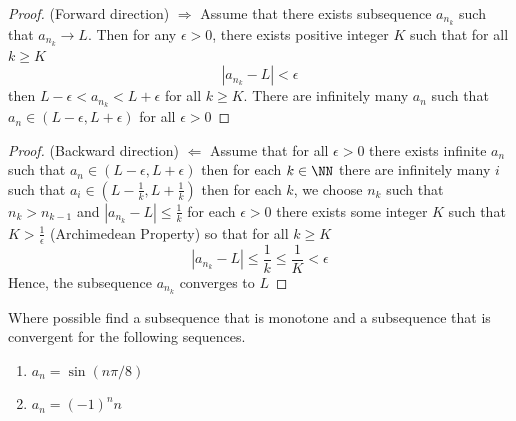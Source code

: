 \documentclass[11pt]{article}
\begin{document}
\begin{proof} (Forward direction)
  $\Longrightarrow$ Assume that there exists subsequence $a_{n_k}$ such that $a_{n_k} \rightarrow L$. 
  Then for any $\epsilon > 0$, there exists positive integer $K$ such that for all $k \geq K$ $$|a_{n_k} - L| < \epsilon$$
  then $L-\epsilon < a_{n_k} < L+\epsilon$ for all $k \geq K$. There are infinitely many $a_n$ such that $a_n \in (L-\epsilon,L+\epsilon)$ for all $\epsilon > 0$ 
\end{proof}

\begin{proof} (Backward direction)
  $\Longleftarrow$ Assume that for all $\epsilon > 0$ there exists infinite $a_n$ such that $a_n \in (L-\epsilon,L+\epsilon)$
 then for each $k \in \NN$ there are infinitely many $i$ such that $a_i \in (L-\frac1k,L+\frac1k)$ then for each $k$, we choose $n_k$ such that $n_k > n_{k-1}$ and $|a_{n_k}-L| \leq \frac1k$
 for each $\epsilon > 0$ there exists some integer $K$ such that $K > \frac1\epsilon$ (Archimedean Property) so that for all $k \geq K$ 
 \[
 |a_{n_k} - L| \leq \frac1k \leq \frac1K  < \epsilon
 \]
 Hence, the subsequence $a_{n_k}$ converges to $L$
\end{proof}
\begin{problem}[15pt]
  Where possible find a subsequence that is monotone and a subsequence that is convergent
  for the following sequences.
  \begin{enumerate}
    \item $a_n = \sin(n\pi/8)$
    \item $a_n = (-1)^n n$
  \end{enumerate}
\end{problem}
\end{document}
